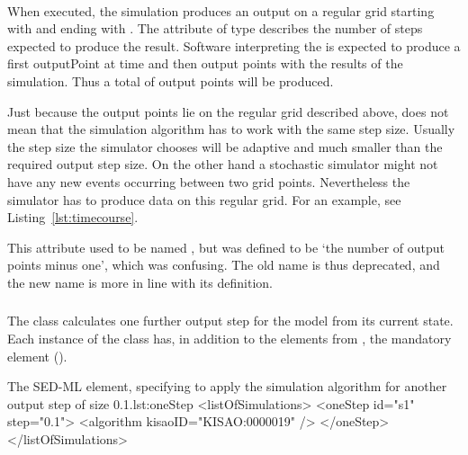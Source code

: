 \paragraph*{}
\label{sec:numberOfSteps}
When executed, the \hyperref[class:uniformTimeCourse]{} simulation produces an output on a regular grid starting with \hyperref[sec:outputStartTime]{} and ending with \hyperref[sec:outputEndTime]{}. The attribute  of type  describes the number of steps expected to produce the result. Software interpreting the \hyperref[class:uniformTimeCourse]{} is expected to produce a first outputPoint at time \hyperref[sec:outputStartTime]{} and then  output points with the results of the simulation. Thus a total of  output points will be produced.

Just because the output points lie on the regular grid described above, does not mean that the simulation algorithm has to work with the same step size. Usually the step size the simulator chooses will be adaptive and much smaller than the required output step size. On the other hand a stochastic simulator might not have any new events occurring between two grid points. Nevertheless the simulator has to produce data on this regular grid. For an example, see Listing~\ref{lst:timecourse}.

This attribute used to be named , but was defined to be `the number of output points minus one', which was confusing.  The old name is thus deprecated, and the new name is more in line with its definition.


\subsubsection{}
\label{class:oneStep}

The  class calculates one further output step for the model from its current state. Each instance of the  class has, in addition to the elements from \Simulation, the mandatory element \hyperref[sec:step]{} ().


\begin{myXmlLst}{The SED-ML  element, specifying to apply the simulation algorithm for another output step of size 0.1.}{lst:oneStep}
<listOfSimulations> 
	<oneStep id="s1" step="0.1"> 
		<algorithm kisaoID="KISAO:0000019" />
	</oneStep> 
</listOfSimulations>
\end{myXmlLst}

